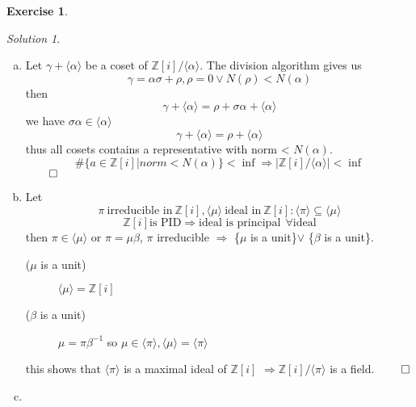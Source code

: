 \documentclass[a4paper,twoside=false,abstract=false,numbers=noenddot,
titlepage=false,headings=small,parskip=half,version=last]{scrartcl}
\theoremstyle{definition}
\newtheorem{exercise}{Exercise}
\theoremstyle{remark}
\newtheorem*{solution}{Solution}
\newcommand{\ZZ}{\ensuremath{\mathbb{Z}}}
\begin{document}
\begin{exercise}
{\bf
}
\end{exercise}
\begin{solution}

\begin{enumerate}[a)]
    \item 
        Let $\gamma + \langle \alpha \rangle$ be a coset of
        $\ZZ\left[i\right]/\langle \alpha \rangle$. The division algorithm
        gives us 
        \begin{equation}
            \gamma=\alpha\sigma + \rho,\rho=0 \vee N(\rho)<N(\alpha)
        \end{equation}
        then
        \begin{equation}
            \gamma+\langle\alpha\rangle=\rho+\sigma\alpha+\langle\alpha\rangle
        \end{equation}
        we have $\sigma\alpha\in\langle\alpha\rangle$
        \begin{equation}
            \gamma+\langle\alpha\rangle=\rho+\langle\alpha\rangle
        \end{equation}
        thus all cosets contains a representative with norm < $N(\alpha)$.
        \begin{equation}
            \#\{a\in\ZZ\left[i\right]|norm < N(\alpha)\}<\inf \Rightarrow
            |\ZZ\left[i\right] / \langle\alpha\rangle|<\inf
        \end{equation}
        $\qed$
    \item
        Let 
        \begin{equation}
            \pi ~\text{irreducible in}~ \ZZ\left[i\right],\langle\mu\rangle 
            ~\text{ideal in}~ \ZZ\left[i\right]
            :\langle\pi\rangle\subseteq\langle\mu\rangle
        \end{equation}
        \begin{equation}
            \ZZ\left[i\right] \text{is PID} \Rightarrow \text{ideal is
            principal} ~~\forall \text{ideal}
        \end{equation}
        then $\pi\in\langle\mu\rangle$ or $\pi=\mu\beta$, $\pi$ irreducible
        $\Rightarrow$ \{$\mu$ is a unit\}$\vee$ \{$\beta$ is a unit\}.
        \begin{description}
            \item[($\mu$ is a unit)] $\langle\mu\rangle=\ZZ\left[i\right]$
            \item[($\beta$ is a unit)] $\mu=\pi\beta^{-1}$ so
            $\mu\in\langle\pi\rangle,\langle\mu\rangle=\langle\pi\rangle$
        \end{description}
        this shows that $\langle\pi\rangle$ is a maximal ideal of
        $\ZZ\left[i\right]$ $\Rightarrow \ZZ\left[i\right]/\langle\pi\rangle$
        is a field. $\qed$ 
    \item 

\end{enumerate}

\end{solution}

\end{document}
